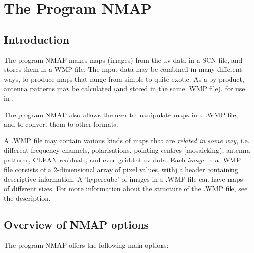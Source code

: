 %
%
\chapter{The Program NMAP}
\tableofcontents

\section{ Introduction}
\label{.intro}

	The \NEWSTAR program NMAP makes maps (images) from the uv-data in a
SCN-file, and stores them in a WMP-file. The input data may be combined in many
different ways, to produce maps that range from simple to quite exotic.  As a
by-product, antenna patterns may be calculated (and stored in the same .WMP
file), for use in .

	The program NMAP also allows the user to manipulate maps in a .WMP file,
and to convert them to other formats.

	A .WMP file may contain various kinds of maps that are {\em related in
some way}, i.e. different frequency channels, polarisations, pointing centres
(mosaicking), antenna patterns, CLEAN residuals, and even gridded uv-data. Each
{\em image} in a .WMP file consists of a 2-dimensional array of pixel values,
withj a header containing descriptive information. A 'hypercube' of images
in a .WMP file can have maps of different sizes. For more information about the
structure of the .WMP file, see the  description.

\section{Overview of NMAP options}
\label{.options}

The program NMAP offers the following main options:

